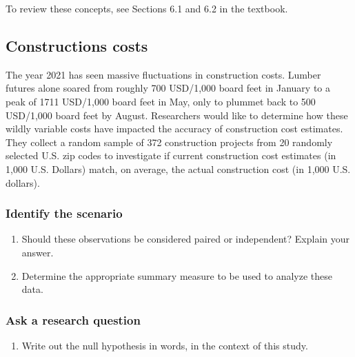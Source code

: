 \documentclass[
]{report}
\providecommand{\tightlist}{%
  \setlength{\itemsep}{0pt}\setlength{\parskip}{0pt}}
\begin{document}
To review these concepts, see Sections 6.1 and 6.2 in the textbook.

\hypertarget{constructions-costs}{%
\subsection{Constructions costs}\label{constructions-costs}}

The year 2021 has seen massive fluctuations in construction costs. Lumber futures alone soared from roughly 700 USD/1,000 board feet in January to a peak of 1711 USD/1,000 board feet in May, only to plummet back to 500 USD/1,000 board feet by August. Researchers would like to determine how these wildly variable costs have impacted the accuracy of construction cost estimates. They collect a random sample of 372 construction projects from 20 randomly selected U.S. zip codes to investigate if current construction cost estimates (in 1,000 U.S. Dollars) match, on average, the actual construction cost (in 1,000 U.S. dollars).

\hypertarget{identify-the-scenario}{%
\subsubsection{Identify the scenario}\label{identify-the-scenario}}

\begin{enumerate}
\def\labelenumi{\arabic{enumi}.}
\item
  Should these observations be considered paired or independent? Explain your answer.
  \vspace{0.5in}
\item
  Determine the appropriate summary measure to be used to analyze these data.
  \vspace{0.25in}
\end{enumerate}

\hypertarget{ask-a-research-question-3}{%
\subsubsection*{Ask a research question}\label{ask-a-research-question-3}}

\begin{enumerate}
\def\labelenumi{\arabic{enumi}.}
\setcounter{enumi}{2}
\tightlist
\item
  Write out the null hypothesis in words, in the context of this study.
\end{enumerate}
\end{document}
